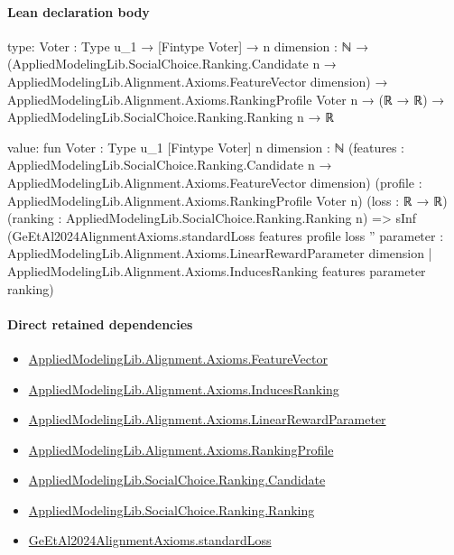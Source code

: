 \documentclass[10pt]{article}
\begin{document}
\paragraph{Lean declaration body}
\begin{ReviewVerbatim}
type:
{Voter : Type u_1} →
  [Fintype Voter] →
    {n dimension : ℕ} →
      (AppliedModelingLib.SocialChoice.Ranking.Candidate n →
          AppliedModelingLib.Alignment.Axioms.FeatureVector dimension) →
        AppliedModelingLib.Alignment.Axioms.RankingProfile Voter n →
          (ℝ → ℝ) → AppliedModelingLib.SocialChoice.Ranking.Ranking n → ℝ

value:
fun {Voter : Type u_1} [Fintype Voter] {n dimension : ℕ}
    (features :
      AppliedModelingLib.SocialChoice.Ranking.Candidate n → AppliedModelingLib.Alignment.Axioms.FeatureVector dimension)
    (profile : AppliedModelingLib.Alignment.Axioms.RankingProfile Voter n) (loss : ℝ → ℝ)
    (ranking : AppliedModelingLib.SocialChoice.Ranking.Ranking n) =>
  sInf
    (GeEtAl2024AlignmentAxioms.standardLoss features profile loss ''
      {parameter : AppliedModelingLib.Alignment.Axioms.LinearRewardParameter dimension |
        AppliedModelingLib.Alignment.Axioms.InducesRanking features parameter ranking})
\end{ReviewVerbatim}

\paragraph{Direct retained dependencies}
\begin{itemize}\raggedright
\item \hyperlink{library-prerequisite-a0b67c6a143b0b13}{Applied\allowbreak{}Modeling\allowbreak{}Lib.\allowbreak{}Alignment.\allowbreak{}Axioms.\allowbreak{}Feature\allowbreak{}Vector}
\item \hyperlink{library-prerequisite-b76a2acb4dafbb4d}{Applied\allowbreak{}Modeling\allowbreak{}Lib.\allowbreak{}Alignment.\allowbreak{}Axioms.\allowbreak{}Induces\allowbreak{}Ranking}
\item \hyperlink{library-prerequisite-d58203ca3f4a8c05}{Applied\allowbreak{}Modeling\allowbreak{}Lib.\allowbreak{}Alignment.\allowbreak{}Axioms.\allowbreak{}Linear\allowbreak{}Reward\allowbreak{}Parameter}
\item \hyperlink{library-prerequisite-9bded048a60dfe0a}{Applied\allowbreak{}Modeling\allowbreak{}Lib.\allowbreak{}Alignment.\allowbreak{}Axioms.\allowbreak{}Ranking\allowbreak{}Profile}
\item \hyperlink{library-prerequisite-8c0e6c25845ae78a}{Applied\allowbreak{}Modeling\allowbreak{}Lib.\allowbreak{}Social\allowbreak{}Choice.\allowbreak{}Ranking.\allowbreak{}Candidate}
\item \hyperlink{library-prerequisite-5cde54446d1ae021}{Applied\allowbreak{}Modeling\allowbreak{}Lib.\allowbreak{}Social\allowbreak{}Choice.\allowbreak{}Ranking.\allowbreak{}Ranking}
\item \hyperlink{governing-declaration-ec71d6427fc78225}{Ge\allowbreak{}Et\allowbreak{}Al2024\allowbreak{}Alignment\allowbreak{}Axioms.\allowbreak{}standard\allowbreak{}Loss}
\end{itemize}
\hypertarget{governing-declaration-6270e302eb520ccb}{}
\end{document}
